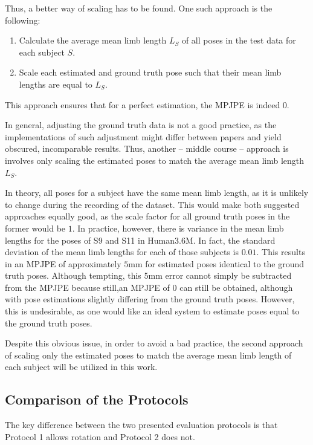 Thus, a better way of scaling has to be found.
One such approach is the following:

\begin{enumerate}[label={\arabic*.}]
	\item Calculate the average mean limb length $L_S$ of all poses in the test data for each subject $S$.
	\item Scale each estimated and ground truth pose such that their mean limb lengths are equal to $L_S$.
\end{enumerate}
This approach ensures that for a perfect estimation, the MPJPE is indeed 0.

In general, adjusting the ground truth data is not a good practice, as the implementations of such adjustment might differ between papers and yield obscured, incomparable results.
Thus, another -- middle course -- approach is involves only scaling the estimated poses to match the average mean limb length $L_S$.

In theory, all poses for a subject have the same mean limb length, as it is unlikely to change during the recording of the dataset.
This would make both suggested approaches equally good, as the scale factor for all ground truth poses in the former would be $1$.
In practice, however, there is variance in the mean limb lengths for the poses of S9 and S11 in Human3.6M.
In fact, the standard deviation of the mean limb lengths for each of those subjects is $0.01$.
This results in an MPJPE of approximately $5$mm for estimated poses identical to the ground truth poses.
Although tempting, this 5mm error cannot simply be subtracted from the MPJPE because still,an MPJPE of 0 can still be obtained, although with pose estimations slightly differing from the ground truth poses.
However, this is undesirable, as one would like an ideal system to estimate poses equal to the ground truth poses.

Despite this obvious issue, in order to avoid a bad practice, the second approach of scaling only the estimated poses to match the average mean limb length of each subject will be utilized in this work.

\subsection{Comparison of the Protocols}

The key difference between the two presented evaluation protocols is that Protocol 1 allows rotation and Protocol 2 does not.



